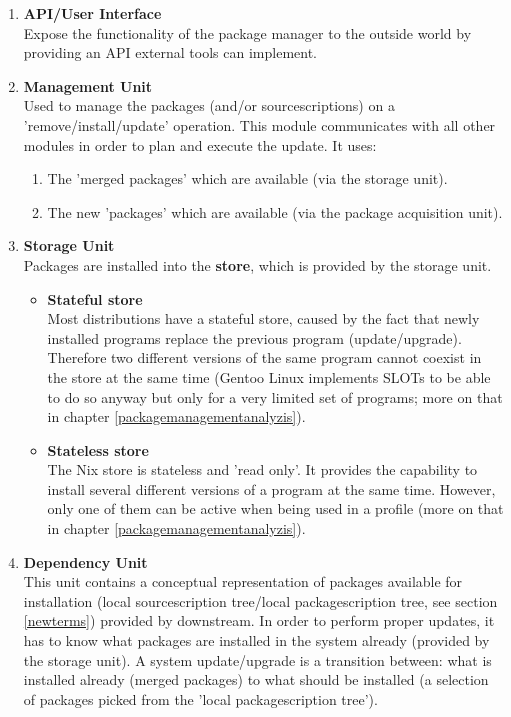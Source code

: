 \documentclass[a4paper,10pt]{article}
\begin{document}
\begin{enumerate}
\item \textbf{API/User Interface}\\
Expose the functionality of the package manager to the outside world by providing an API external tools can implement.




\item \textbf{Management Unit} \\
Used to manage the packages (and/or sourcescriptions) on a 'remove/install/update' operation. This module communicates with all other modules in order to plan and execute the update. It uses:
\begin{enumerate}
\item The 'merged packages' which are available (via the storage unit).
\item The new 'packages' which are available (via the package acquisition unit).
\end{enumerate}





\item \textbf{Storage Unit}\\ 
Packages are installed into the \textbf{store}, which is provided by the storage unit. 
\begin{itemize}
\item \textbf{Stateful store}\\
Most distributions have a stateful store, caused by the fact that newly installed programs replace the previous program (update/upgrade). Therefore two different versions of the same program cannot coexist in the store at the same time (Gentoo Linux implements SLOTs to be able to do so anyway but only for a very limited set of programs; more on that in chapter \ref{packagemanagementanalyzis}). 

\item \textbf{Stateless store}\\
The Nix store is stateless and 'read only'. It provides the capability to install several different versions of a program at the same time. However, only one of them can be active when being used in a profile (more on that in chapter \ref{packagemanagementanalyzis}).
\end{itemize}

\item \textbf{Dependency Unit}\\
This unit contains a conceptual representation of packages available for installation (local sourcescription tree/local packagescription tree, see section \ref{newterms}) provided by downstream. In order to perform proper updates, it has to know what packages are installed in the system already (provided by the storage unit). A system update/upgrade is a transition between: what is installed already (merged packages) to what should be installed (a selection of packages picked from the 'local packagescription tree'). 


\end{enumerate}
\end{document}
